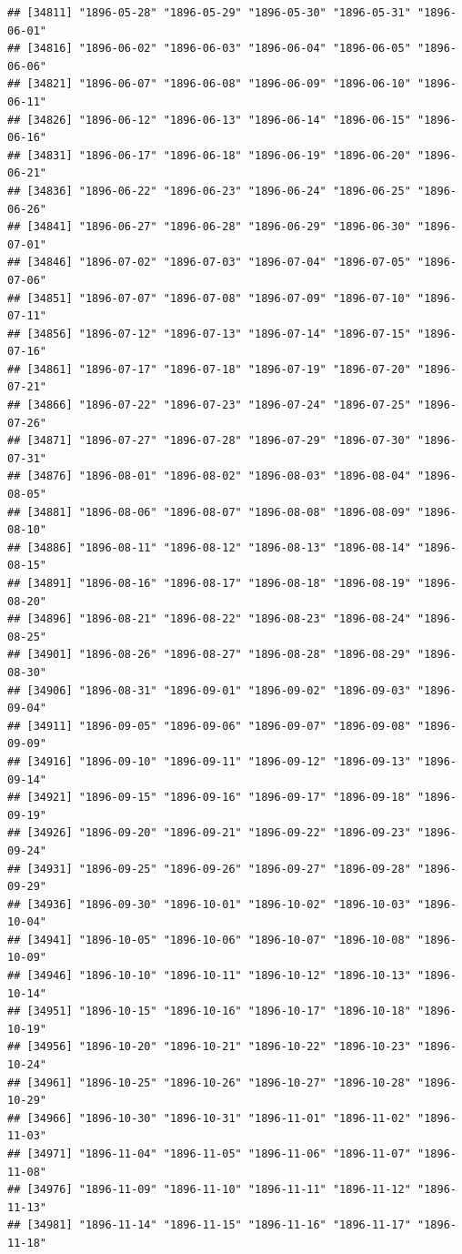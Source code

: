 \documentclass{article}\usepackage[]{graphicx}\usepackage[]{color}
\makeatletter
\newenvironment{kframe}{%
 \def\at@end@of@kframe{}%
 \ifinner\ifhmode%
  \def\at@end@of@kframe{\end{minipage}}%
  \begin{minipage}{\columnwidth}%
 \fi\fi%
 \def\FrameCommand##1{\hskip\@totalleftmargin \hskip-\fboxsep
 \colorbox{shadecolor}{##1}\hskip-\fboxsep
     \hskip-\linewidth \hskip-\@totalleftmargin \hskip\columnwidth}%
 \MakeFramed {\advance\hsize-\width
   \@totalleftmargin\z@ \linewidth\hsize
   \@setminipage}}%
 {\par\unskip\endMakeFramed%
 \at@end@of@kframe}
\newenvironment{knitrout}{}{} %
\makeatother
\begin{document}
\begin{description}
\begin{knitrout}
\begin{kframe}
\begin{verbatim}
## [34811] "1896-05-28" "1896-05-29" "1896-05-30" "1896-05-31" "1896-06-01"
## [34816] "1896-06-02" "1896-06-03" "1896-06-04" "1896-06-05" "1896-06-06"
## [34821] "1896-06-07" "1896-06-08" "1896-06-09" "1896-06-10" "1896-06-11"
## [34826] "1896-06-12" "1896-06-13" "1896-06-14" "1896-06-15" "1896-06-16"
## [34831] "1896-06-17" "1896-06-18" "1896-06-19" "1896-06-20" "1896-06-21"
## [34836] "1896-06-22" "1896-06-23" "1896-06-24" "1896-06-25" "1896-06-26"
## [34841] "1896-06-27" "1896-06-28" "1896-06-29" "1896-06-30" "1896-07-01"
## [34846] "1896-07-02" "1896-07-03" "1896-07-04" "1896-07-05" "1896-07-06"
## [34851] "1896-07-07" "1896-07-08" "1896-07-09" "1896-07-10" "1896-07-11"
## [34856] "1896-07-12" "1896-07-13" "1896-07-14" "1896-07-15" "1896-07-16"
## [34861] "1896-07-17" "1896-07-18" "1896-07-19" "1896-07-20" "1896-07-21"
## [34866] "1896-07-22" "1896-07-23" "1896-07-24" "1896-07-25" "1896-07-26"
## [34871] "1896-07-27" "1896-07-28" "1896-07-29" "1896-07-30" "1896-07-31"
## [34876] "1896-08-01" "1896-08-02" "1896-08-03" "1896-08-04" "1896-08-05"
## [34881] "1896-08-06" "1896-08-07" "1896-08-08" "1896-08-09" "1896-08-10"
## [34886] "1896-08-11" "1896-08-12" "1896-08-13" "1896-08-14" "1896-08-15"
## [34891] "1896-08-16" "1896-08-17" "1896-08-18" "1896-08-19" "1896-08-20"
## [34896] "1896-08-21" "1896-08-22" "1896-08-23" "1896-08-24" "1896-08-25"
## [34901] "1896-08-26" "1896-08-27" "1896-08-28" "1896-08-29" "1896-08-30"
## [34906] "1896-08-31" "1896-09-01" "1896-09-02" "1896-09-03" "1896-09-04"
## [34911] "1896-09-05" "1896-09-06" "1896-09-07" "1896-09-08" "1896-09-09"
## [34916] "1896-09-10" "1896-09-11" "1896-09-12" "1896-09-13" "1896-09-14"
## [34921] "1896-09-15" "1896-09-16" "1896-09-17" "1896-09-18" "1896-09-19"
## [34926] "1896-09-20" "1896-09-21" "1896-09-22" "1896-09-23" "1896-09-24"
## [34931] "1896-09-25" "1896-09-26" "1896-09-27" "1896-09-28" "1896-09-29"
## [34936] "1896-09-30" "1896-10-01" "1896-10-02" "1896-10-03" "1896-10-04"
## [34941] "1896-10-05" "1896-10-06" "1896-10-07" "1896-10-08" "1896-10-09"
## [34946] "1896-10-10" "1896-10-11" "1896-10-12" "1896-10-13" "1896-10-14"
## [34951] "1896-10-15" "1896-10-16" "1896-10-17" "1896-10-18" "1896-10-19"
## [34956] "1896-10-20" "1896-10-21" "1896-10-22" "1896-10-23" "1896-10-24"
## [34961] "1896-10-25" "1896-10-26" "1896-10-27" "1896-10-28" "1896-10-29"
## [34966] "1896-10-30" "1896-10-31" "1896-11-01" "1896-11-02" "1896-11-03"
## [34971] "1896-11-04" "1896-11-05" "1896-11-06" "1896-11-07" "1896-11-08"
## [34976] "1896-11-09" "1896-11-10" "1896-11-11" "1896-11-12" "1896-11-13"
## [34981] "1896-11-14" "1896-11-15" "1896-11-16" "1896-11-17" "1896-11-18"

\end{verbatim}
\end{kframe}
\end{knitrout}
\end{description}
\end{document}
